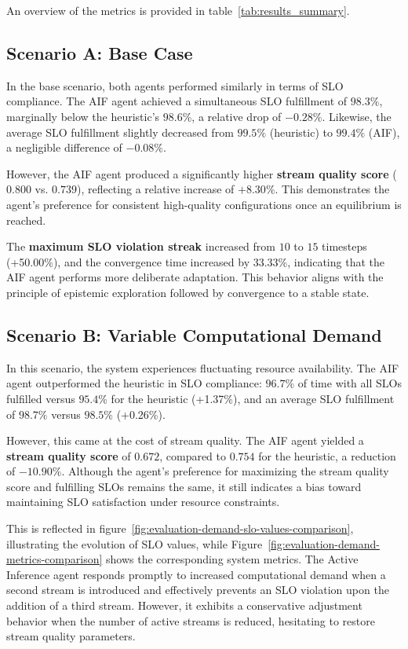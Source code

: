 An overview of the metrics is provided in table~\ref{tab:results_summary}.




\subsection{Scenario A: Base Case}

In the base scenario, both agents performed similarly in terms of SLO compliance. The AIF agent achieved a simultaneous SLO fulfillment of \(98.3\%\), marginally below the heuristic's \(98.6\%\), a relative drop of \(-0.28\%\). Likewise, the average SLO fulfillment slightly decreased from \(99.5\%\) (heuristic) to \(99.4\%\) (AIF), a negligible difference of \(-0.08\%\).

However, the AIF agent produced a significantly higher \textbf{stream quality score} (\(0.800\) vs. \(0.739\)), reflecting a relative increase of \(+8.30\%\). This demonstrates the agent’s preference for consistent high-quality configurations once an equilibrium is reached.

The \textbf{maximum SLO violation streak} increased from \(10\) to \(15\) timesteps (+50.00\%), and the convergence time increased by 33.33\%, indicating that the AIF agent performs more deliberate adaptation. This behavior aligns with the principle of epistemic exploration followed by convergence to a stable state.

\subsection{Scenario B: Variable Computational Demand}

In this scenario, the system experiences fluctuating resource availability. The AIF agent outperformed the heuristic in SLO compliance: \(96.7\%\) of time with all SLOs fulfilled versus \(95.4\%\) for the heuristic (+1.37\%), and an average SLO fulfillment of \(98.7\%\) versus \(98.5\%\) (+0.26\%).

However, this came at the cost of stream quality. The AIF agent yielded a \textbf{stream quality score} of \(0.672\), compared to \(0.754\) for the heuristic, a reduction of \(-10.90\%\). Although the agent's preference for maximizing the stream quality score and fulfilling SLOs remains the same, it still indicates a bias toward maintaining SLO satisfaction under resource constraints. 

This is reflected in figure~\ref{fig:evaluation-demand-slo-values-comparison}, illustrating the evolution of SLO values, while Figure~\ref{fig:evaluation-demand-metrics-comparison} shows the corresponding system metrics. The Active Inference agent responds promptly to increased computational demand when a second stream is introduced and effectively prevents an SLO violation upon the addition of a third stream. However, it exhibits a conservative adjustment behavior when the number of active streams is reduced, hesitating to restore stream quality parameters.

